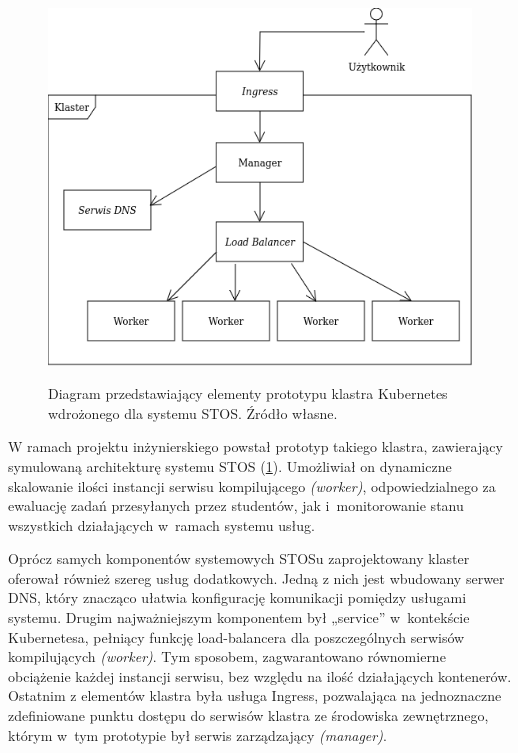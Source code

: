 \begin{figure}[!h]
	\begin{center}
		\resizebox{0.7\textwidth}{!} {
			\includegraphics{img/4/k8s.png}
		}
		\caption[Diagram prototypu klastra Kubernetes]{Diagram przedstawiający elementy prototypu klastra Kubernetes wdrożonego dla systemu STOS. Źródło własne.}
		\label{diagramk8s}
	\end{center}
\end{figure}

W ramach projektu inżynierskiego powstał prototyp takiego klastra, zawierający symulowaną architekturę systemu STOS (\ref{diagramk8s}). Umożliwiał on dynamiczne skalowanie ilości instancji serwisu kompilującego \textit{(worker)}, odpowiedzialnego za ewaluację zadań przesyłanych przez studentów, jak i~monitorowanie stanu wszystkich działających w~ramach systemu usług.

Oprócz samych komponentów systemowych STOSu zaprojektowany klaster oferował również szereg usług dodatkowych. Jedną z nich jest wbudowany serwer DNS, który znacząco ułatwia konfigurację komunikacji pomiędzy usługami systemu\cite{k8sDns}. Drugim najważniejszym komponentem był „service” w~kontekście Kubernetesa, pełniący funkcję load-balancera dla poszczególnych serwisów kompilujących \textit{(worker)}. Tym sposobem, zagwarantowano równomierne obciążenie każdej instancji serwisu, bez względu na ilość działających kontenerów\cite{k8sService}. Ostatnim z elementów klastra była usługa Ingress, pozwalająca na jednoznaczne zdefiniowane punktu dostępu do serwisów klastra ze środowiska zewnętrznego, którym w~tym prototypie był serwis zarządzający \textit{(manager)}\cite{k8sIngress}.

